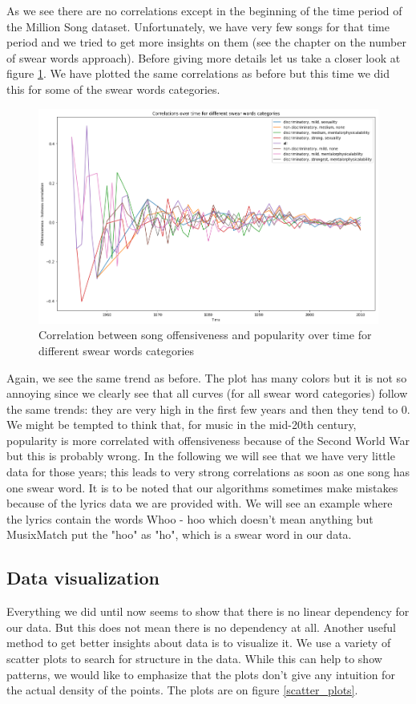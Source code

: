 \documentclass[11pt]{article}
\begin{document}
As we see there are no correlations except in the beginning of the time period of the Million Song dataset. Unfortunately, we have very few songs for that time period and we tried to get more insights on them (see the chapter on the number of swear words approach). Before giving more details let us take a closer look at figure \ref{correlation_time_categories}. We have plotted the same correlations as before but this time we did this for some of the swear words categories.

\begin{figure}
\includegraphics[width=\linewidth]{plots/correlation_time_categories}
\caption{Correlation between song offensiveness and popularity over time for different swear words categories}
\label{correlation_time_categories}
\end{figure}

Again, we see the same trend as before. The plot has many colors but it is not so annoying since we clearly see that all curves (for all swear word categories) follow the same trends: they are very high in the first few years and then they tend to 0. We might be tempted to think that, for music in the mid-20th century, popularity is more correlated with offensiveness because of the Second World War but this is probably wrong. In the following we will see that we have very little data for those years; this leads to very strong correlations as soon as one song has one swear word. It is to be noted that our algorithms sometimes make mistakes because of the lyrics data we are provided with. We will see an example where the lyrics contain the words Whoo - hoo which doesn't mean anything but MusixMatch put the "hoo" as "ho", which is a swear word in our data.

\subsection{Data visualization}
Everything we did until now seems to show that there is no linear dependency for our data. 
But this does not mean there is no dependency at all. 
Another useful method to get better insights about data is to visualize it. 
We use a variety of scatter plots to search for structure in the data.
While this can help to show patterns, we would like to emphasize that the plots don't give any intuition for the actual density of the points.
The plots are on figure \ref{scatter_plots}.
\end{document}
